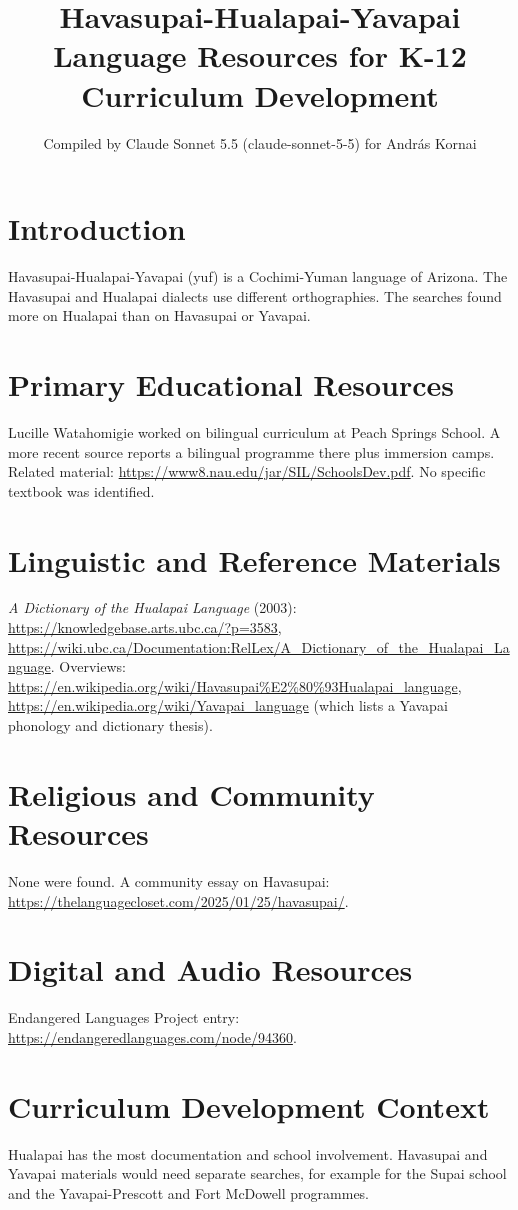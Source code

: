 \documentclass[12pt]{article}
\title{Havasupai-Hualapai-Yavapai Language Resources for K-12 Curriculum Development}
\author{Compiled by Claude Sonnet 5.5 (claude-sonnet-5-5) for Andr\'as Kornai}
\date{}
\begin{document}
\maketitle

\section{Introduction}
Havasupai-Hualapai-Yavapai (yuf) is a Cochimi-Yuman language of Arizona. The Havasupai and Hualapai dialects use different orthographies. The searches found more on Hualapai than on Havasupai or Yavapai.

\section{Primary Educational Resources}
Lucille Watahomigie worked on bilingual curriculum at Peach Springs School. A more recent source reports a bilingual programme there plus immersion camps. Related material: \url{https://www8.nau.edu/jar/SIL/SchoolsDev.pdf}. No specific textbook was identified.

\section{Linguistic and Reference Materials}
\emph{A Dictionary of the Hualapai Language} (2003): \url{https://knowledgebase.arts.ubc.ca/?p=3583}, \url{https://wiki.ubc.ca/Documentation:RelLex/A_Dictionary_of_the_Hualapai_Language}. Overviews: \url{https://en.wikipedia.org/wiki/Havasupai%E2%80%93Hualapai_language}, \url{https://en.wikipedia.org/wiki/Yavapai_language} (which lists a Yavapai phonology and dictionary thesis).

\section{Religious and Community Resources}
None were found. A community essay on Havasupai: \url{https://thelanguagecloset.com/2025/01/25/havasupai/}.

\section{Digital and Audio Resources}
Endangered Languages Project entry: \url{https://endangeredlanguages.com/node/94360}.

\section{Curriculum Development Context}
Hualapai has the most documentation and school involvement. Havasupai and Yavapai materials would need separate searches, for example for the Supai school and the Yavapai-Prescott and Fort McDowell programmes.
\end{document}

